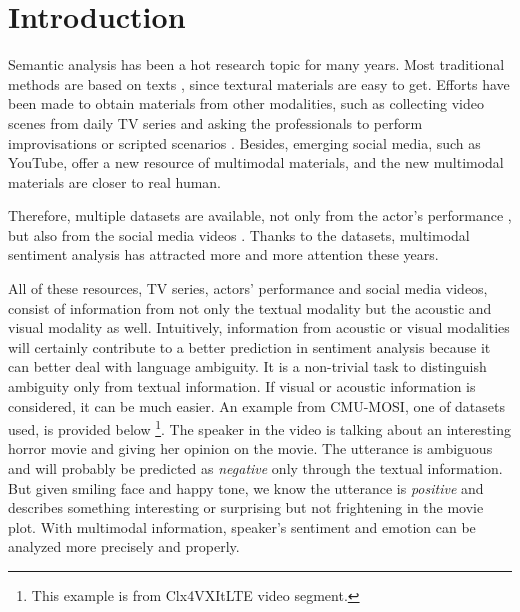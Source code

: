 \documentclass[sigconf]{acmart}
\begin{document}






\maketitle

\section{Introduction}
	Semantic analysis has been a hot research topic for many years. Most traditional methods are based on texts \cite{hu2004mining,liu2012sentiment,mohammad2013nrc}, since textural materials are easy to get. Efforts have been made to obtain materials from other modalities, such as collecting video scenes from daily TV series \cite{poria2018meld} and asking the professionals to perform improvisations or scripted scenarios \cite{busso2008iemocap}. Besides, emerging social media, such as YouTube, offer a new resource of multimodal materials, and the new multimodal materials are closer to real human.
	
	Therefore, multiple datasets are available, not only from the actor's performance \cite{busso2008iemocap, poria2018meld}, but also from the social media videos \cite{zadeh2016mosi}. Thanks to the datasets, multimodal sentiment analysis has attracted more and more attention these years.

	All of these resources, TV series, actors' performance and social media videos, consist of information from not only the textual modality but the acoustic and visual modality as well. Intuitively, information from acoustic or visual modalities will certainly contribute to a better prediction in sentiment analysis because it can better deal with language ambiguity. It is a non-trivial task to distinguish ambiguity only from textual information. If visual or acoustic information is considered, it can be much easier. An example from CMU-MOSI, one of datasets used, is provided below \footnote{This example is from Clx4VXItLTE video segment.}. The speaker in the video is talking about an interesting horror movie and giving her opinion on the movie. The utterance is ambiguous and will probably be predicted as \textit{negative} only through the textual information. But given smiling face and happy tone, we know the utterance is \textit{positive} and describes something interesting or surprising but not frightening in the movie plot.	With multimodal information, speaker's sentiment and emotion can be analyzed more precisely and properly.
	
\end{document}
